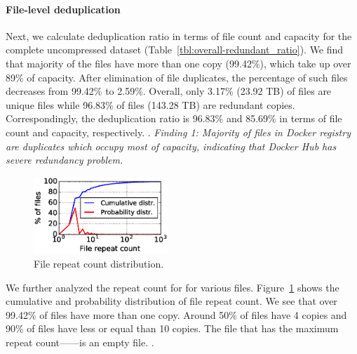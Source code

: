 
\paragraph{File-level deduplication}
Next, we calculate deduplication ratio in terms of file count and capacity for
the complete uncompressed dataset (Table~\ref{tbl:overall-redundant_ratio}).
%
We find that majority of the files have more than one copy (99.42\%), which
take up over 89\% of capacity.
%
%
After elimination of file duplicates, the percentage of such files decreases
from 99.42\% to 2.59\%.  
%
%
Overall, only 3.17\% (23.92 TB) of files are unique files while 96.83\% of
files (143.28 TB) are redundant copies. 
%
Correspondingly, the deduplication ratio is 96.83\% and 85.69\% in terms of
file count and capacity, respectively.
%
.
%
%
\textit{Finding 1: Majority of files in Docker registry are duplicates which
occupy most of capacity, indicating that Docker Hub has severe redundancy
problem.}




\begin{figure} \centering
	\includegraphics[width=0.45\textwidth]{graphs/File_repeat_count.eps}
	\caption{File repeat count distribution.  } \label{fig:file-repeat-cnt}
\end{figure}

We further analyzed the repeat count for for various files.
%
Figure~\ref{fig:file-repeat-cnt} shows the cumulative and probability
distribution of file repeat count.  
%
We see that over 99.42\% of files have more than one copy.
%
Around 50\% of files have 4 copies and 90\% of files have less or equal than 10
copies. 
%
The file that has the maximum repeat count------is an empty file.
%
.
